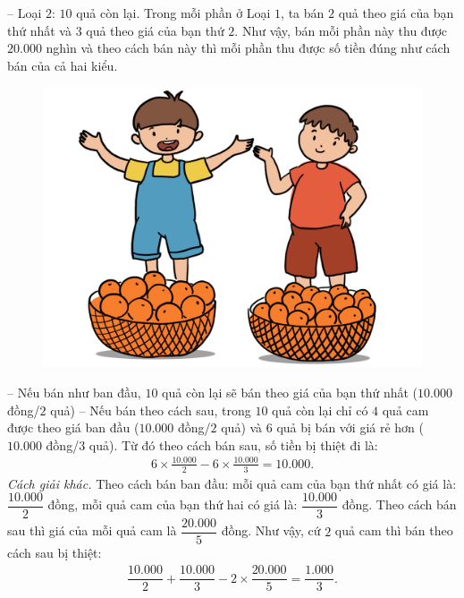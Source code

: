 \begin{multicols}{2}
	\vskip 0.1cm
	-- Loại $2$: $10$ quả còn lại.
	\vskip 0.1cm
	Trong mỗi phần ở Loại $1$, ta bán $2$ quả theo giá của bạn thứ nhất và $3$ quả theo giá của bạn thứ $2$. Như vậy, bán mỗi phần này  thu được $20{.}000$ nghìn và theo cách bán này thì mỗi phần thu được số tiền đúng như cách bán của cả hai kiểu.
	\begin{figure}[H]
		\centering
		\vspace*{-10pt}
		\captionsetup{labelformat= empty, justification=centering}
		\includegraphics[width=0.9\linewidth]{Pi10_ToanBi_Bai2}
		\vspace*{-10pt}
	\end{figure}
	-- Nếu bán như ban đầu, $10$ quả còn lại sẽ bán theo giá của bạn thứ nhất ($10{.}000$ đồng/$2$ quả)
	\vskip 0.1cm
	-- Nếu bán theo cách sau, trong $10$ quả còn lại chỉ có $4$ quả cam được theo giá ban đầu ($10{.}000$ đồng/$2$ quả) và $6$ quả bị bán với giá rẻ hơn ($10{.}000$ đồng/$3$ quả).
	\vskip 0.1cm
	Từ đó theo cách bán sau, số tiền bị thiệt đi là:
	\setlength{\abovedisplayskip}{5pt}
	\setlength{\belowdisplayskip}{5pt}
	\begin{align*}
		6\times\frac{10{.}000}{2} - 6\times\frac{10{.}000}{3} = 10{.}000.
	\end{align*}
	\textit{Cách giải khác.}
	\vskip 0.1cm
	Theo cách bán ban đầu: mỗi quả cam của bạn thứ nhất có giá là: $\dfrac{10{.}000}{2}$ đồng, mỗi quả cam của bạn thứ hai có giá là: $\dfrac{10{.}000}{3}$ đồng.
	\vskip 0.1cm
	Theo cách bán sau thì giá của mỗi quả cam là $\dfrac{20{.}000}{5}$ đồng.
	\vskip 0.1cm
	Như vậy, cứ $2$ quả cam thì bán theo cách sau bị thiệt:
	\begin{align*}
		\dfrac{10{.}000}{2} + \dfrac{10{.}000}{3} - 2\times\dfrac{20{.}000}{5} = \dfrac{1{.}000}{3}.

\end{align*}
\end{multicols}

